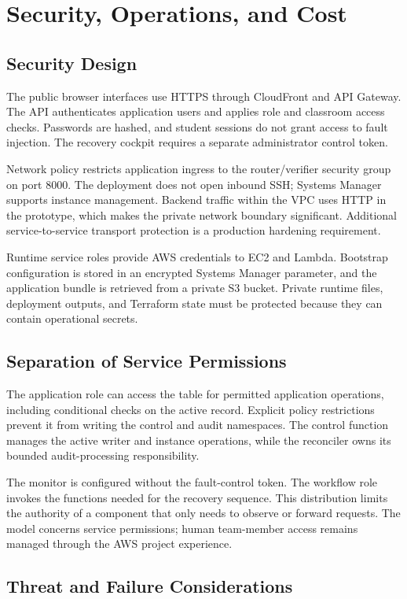 \chapter{Security, Operations, and Cost}
\section{Security Design}
The public browser interfaces use HTTPS through CloudFront and API Gateway. The API authenticates application users and applies role and classroom access checks. Passwords are hashed, and student sessions do not grant access to fault injection. The recovery cockpit requires a separate administrator control token.

Network policy restricts application ingress to the router/verifier security group on port 8000. The deployment does not open inbound SSH; Systems Manager supports instance management. Backend traffic within the VPC uses HTTP in the prototype, which makes the private network boundary significant. Additional service-to-service transport protection is a production hardening requirement.

Runtime service roles provide AWS credentials to EC2 and Lambda. Bootstrap configuration is stored in an encrypted Systems Manager parameter, and the application bundle is retrieved from a private S3 bucket. Private runtime files, deployment outputs, and Terraform state must be protected because they can contain operational secrets.
\section{Separation of Service Permissions}
The application role can access the table for permitted application operations, including conditional checks on the active record. Explicit policy restrictions prevent it from writing the control and audit namespaces. The control function manages the active writer and instance operations, while the reconciler owns its bounded audit-processing responsibility.

The monitor is configured without the fault-control token. The workflow role invokes the functions needed for the recovery sequence. This distribution limits the authority of a component that only needs to observe or forward requests. The model concerns service permissions; human team-member access remains managed through the AWS project experience.
\section{Threat and Failure Considerations}

